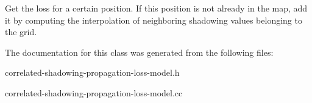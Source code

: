 Get the loss for a certain position. If this position is not already in the map, add it by computing the interpolation of neighboring shadowing values belonging to the grid. 

The documentation for this class was generated from the following files\+:\begin{DoxyCompactItemize}
\item 
correlated-\/shadowing-\/propagation-\/loss-\/model.\+h\item 
correlated-\/shadowing-\/propagation-\/loss-\/model.\+cc\end{DoxyCompactItemize}

